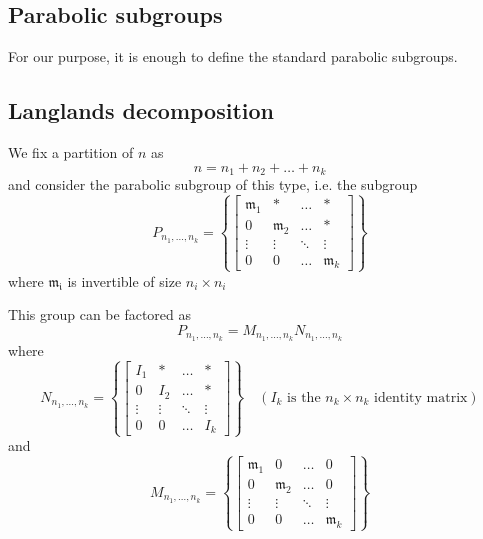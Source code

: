 \documentclass[12pt]{article} %
\begin{document}
\subsection{Parabolic subgroups}
For our purpose, it is enough to define the standard parabolic subgroups. 
\subsection{Langlands decomposition}
We fix a partition of $n$ as
\[n=n_1+n_2+\ldots+n_k\]
and consider the parabolic subgroup of this type, i.e. the subgroup
\[P_{n_1,\ldots, n_k} = \left\lbrace \begin{bmatrix}
        \mathfrak{m}_1 & \ast           & \ldots & \ast           \\
        0              & \mathfrak{m}_2 & \ldots & \ast           \\
        \vdots         & \vdots         & \ddots & \vdots         \\
        0              & 0              & \ldots & \mathfrak{m}_k
    \end{bmatrix} \right\rbrace\]
where $\mathfrak{m_i}$ is invertible of size $n_i \times n_i$

This group can be factored as
\[P_{n_1,\ldots, n_k} =M_{n_1,\ldots, n_k}N_{n_1,\ldots, n_k}\]
where
\[N_{n_1,\ldots, n_k} = \left\lbrace \begin{bmatrix}
        I_1    & \ast   & \ldots & \ast   \\
        0      & I_2    & \ldots & \ast   \\
        \vdots & \vdots & \ddots & \vdots \\
        0      & 0      & \ldots & I_k
    \end{bmatrix} \right\rbrace \quad \left(I_k \text{ is the $n_k\times n_k$ identity matrix}\right)\]
and
\[M_{n_1,\ldots, n_k} = \left\lbrace \begin{bmatrix}
        \mathfrak{m}_1 & 0              & \ldots & 0              \\
        0              & \mathfrak{m}_2 & \ldots & 0              \\
        \vdots         & \vdots         & \ddots & \vdots         \\
        0              & 0              & \ldots & \mathfrak{m}_k
    \end{bmatrix} \right\rbrace\]
\end{document}
